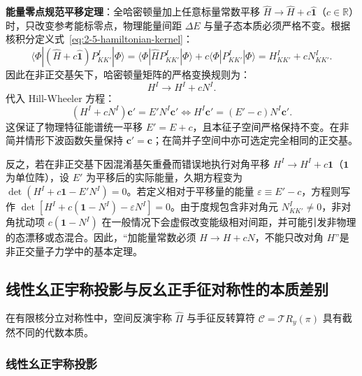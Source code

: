 \textbf{能量零点规范平移定理}：全哈密顿量加上任意标量常数平移 $\hat{H} \to \hat{H} + c \hat{\mathbf{1}}$（$c \in \mathbb{R}$）时，只改变参考能标零点，物理能量间距 $\Delta E$ 与量子态本质必须严格不变。根据核积分定义式~\eqref{eq:2-5-hamiltonian-kernel}：
\begin{equation}\label{eq:2-5-shift-kernel}
\langle \Phi | (\hat{H} + c \hat{\mathbf{1}}) P^I_{KK'} | \Phi \rangle = \langle \Phi | \hat{H} P^I_{KK'} | \Phi \rangle + c \langle \Phi | P^I_{KK'} | \Phi \rangle = H^I_{KK'} + c N^I_{KK'}.
\end{equation}
因此在非正交基矢下，哈密顿量矩阵的严格变换规则为：
\begin{equation}\label{eq:2-5-H-shift-matrix}
H^I \to H^I + c N^I.
\end{equation}
代入 Hill-Wheeler 方程：
\begin{equation}\label{eq:2-5-gauge-invariance}
(H^I + c N^I) \mathbf{c}' = E' N^I \mathbf{c}' \iff H^I \mathbf{c}' = (E' - c) N^I \mathbf{c}'.
\end{equation}
这保证了物理特征能谱统一平移 $E' = E + c$，且本征子空间严格保持不变。在非简并情形下波函数矢量保持 $\mathbf{c}' = \mathbf{c}$；在简并子空间中亦可选定完全相同的正交基。

反之，若在非正交基下因混淆基矢重叠而错误地执行对角平移 $H^I \to H^I + c \mathbf{1}$（$\mathbf{1}$ 为单位阵），设 $E'$ 为平移后的实际能量，久期方程变为 $\det(H^I + c \mathbf{1} - E' N^I) = 0$。若定义相对于平移量的能量 $\varepsilon \equiv E' - c$，方程则写作 $\det[H^I + c(\mathbf{1} - N^I) - \varepsilon N^I] = 0$。由于度规包含非对角元 $N^I_{KK'} \ne 0$，非对角扰动项 $c(\mathbf{1} - N^I)$ 在一般情况下会虚假改变能级相对间距，并可能引发非物理的态漂移或态混合。因此，“加能量常数必须 $H \to H + c N$，不能只改对角 $H$”是非正交量子力学中的基本定理。

\subsection{线性幺正宇称投影与反幺正手征对称性的本质差别}\label{sec:2-5-4}

在有限核分立对称性中，空间反演宇称 $\hat{\Pi}$ 与手征反转算符 $\mathcal{C} = \mathcal{T} R_y(\pi)$ 具有截然不同的代数本质。

\subsubsection{线性幺正宇称投影}\label{sec:2-5-4-1}

